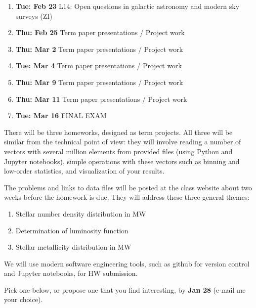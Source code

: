 \documentclass[10pt]{article}
\begin{document}
\begin{enumerate}
  \item {\bf Tue: Feb 23}  L14: Open questions in galactic astronomy and modern sky surveys (ZI) 

  \item {\bf Thu: Feb 25}   Term paper presentations  /  Project work
  \item {\bf Thu: Mar 2}    Term paper presentations  /  Project work
  \item {\bf Tue: Mar 4}    Term paper presentations  /  Project work
  \item {\bf Thu: Mar 9}    Term paper presentations  /  Project work
  \item {\bf Thu: Mar 11}   Term paper presentations  /  Project work  
  \item {\bf Tue: Mar 16} FINAL EXAM
\end{enumerate}


\vskip 0.2in


There will be three homeworks, designed as term projects. All three will be similar
from the technical point of view: they will involve reading a number of vectors with several 
million elements from provided files (using Python and Jupyter notebooks), simple operations 
with these vectors such as binning and low-order statistics, and visualization of your results. 

The problems and links to data files will be posted at the class website about two weeks 
before the homework is due. They will address these three general themes:

\begin{enumerate}
\item Stellar number density distribution in MW
\item Determination of luminosity function 
\item Stellar metallicity distribution in MW  
\end{enumerate}

We will use modern software engineering tools, such as github for version control and Jupyter 
notebooks, for HW submission. 

\vskip 0.2in

 Pick one below, or propose one that you find interesting, by {\bf Jan 28} (e-mail me your choice).
\end{document}
